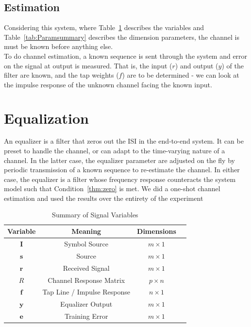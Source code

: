 \documentclass[]{article}
\begin{document}
\subsection{Estimation}
\label{sec:estimate}

Considering this system, where Table~\ref{tab:filtersummary} describes the variables and Table~\ref{tab:Paramsummary} describes the dimension parameters, the channel is must be known before anything else. \\

To do channel estimation, a known sequence is sent through the system and error on the signal at output is measured.  That is, the input ($r$) and output ($y$) of the filter are known, and the tap weights ($f$) are to be determined - we can look at the impulse response of the unknown channel facing the known input.  

\section{Equalization}
\label{sec:equal}
An equalizer is a filter that zeros out the ISI in the end-to-end system.  It can be preset to handle the channel, or can adapt to the time-varying nature of a channel.  In the latter case, the equalizer parameter are adjusted on the fly by periodic transmission of a known sequence to re-estimate the channel.  In either case, the equalizer is a filter whose frequency response counteracts the system model such that Condition~\ref{thm:zero} is met.  We did a one-shot channel estimation and used the results over the entirety of the experiment

\begin{table}[H]
\begin{center}
\begin{tabular}{|c|c|c|c|}
\hline Variable & Meaning & Dimensions \\
\hline \hline
$\mathbf{I}$ & Symbol Source & $ m \times 1$ \\ \hline
$\mathbf{s}$ & Source & $m\times 1 $\\ \hline
$\mathbf{r}$ & Received Signal & $m\times 1$ \\ \hline
$R$ & Channel Response Matrix & $p\times n$ \\ \hline
$\mathbf{f}$ & Tap Line / Impulse Response & $n\times 1 $ \\ \hline
$\mathbf{y}$ & Equalizer Output & $ m\times 1 $ \\ \hline
 $\mathbf{e}$ & Training Error & $ m\times 1 $ \\ \hline
\end{tabular}
\caption{Summary of Signal Variables} \label{tab:filtersummary}
\end{center}
\end{table}
\end{document}
